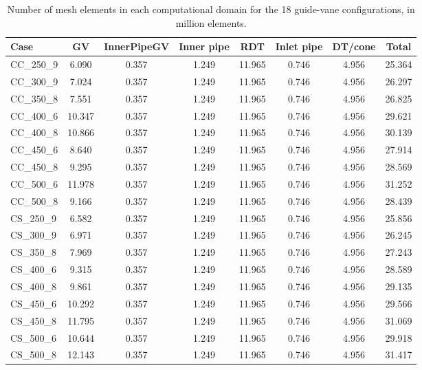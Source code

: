 \begin{table}[H]
\centering
\small
\caption[Mesh element count per domain]{Number of mesh elements in each computational domain for the 18 guide-vane configurations, in million elements.}
\label{tab:mesh-elements-gv-cases}
\begin{tabular}{lccccccc}
\hline
Case
& GV
& InnerPipeGV
& Inner pipe
& RDT
& Inlet pipe
& DT/cone
& Total \\
\hline
CC\_250\_9 & 6.090 & 0.357 & 1.249 & 11.965 & 0.746 & 4.956 & 25.364 \\
CC\_300\_9 & 7.024 & 0.357 & 1.249 & 11.965 & 0.746 & 4.956 & 26.297 \\
CC\_350\_8 & 7.551 & 0.357 & 1.249 & 11.965 & 0.746 & 4.956 & 26.825 \\
CC\_400\_6 & 10.347 & 0.357 & 1.249 & 11.965 & 0.746 & 4.956 & 29.621 \\
CC\_400\_8 & 10.866 & 0.357 & 1.249 & 11.965 & 0.746 & 4.956 & 30.139 \\
CC\_450\_6 & 8.640 & 0.357 & 1.249 & 11.965 & 0.746 & 4.956 & 27.914 \\
CC\_450\_8 & 9.295 & 0.357 & 1.249 & 11.965 & 0.746 & 4.956 & 28.569 \\
CC\_500\_6 & 11.978 & 0.357 & 1.249 & 11.965 & 0.746 & 4.956 & 31.252 \\
CC\_500\_8 & 9.166 & 0.357 & 1.249 & 11.965 & 0.746 & 4.956 & 28.439 \\
\hline
CS\_250\_9 & 6.582 & 0.357 & 1.249 & 11.965 & 0.746 & 4.956 & 25.856 \\
CS\_300\_9 & 6.971 & 0.357 & 1.249 & 11.965 & 0.746 & 4.956 & 26.245 \\
CS\_350\_8 & 7.969 & 0.357 & 1.249 & 11.965 & 0.746 & 4.956 & 27.243 \\
CS\_400\_6 & 9.315 & 0.357 & 1.249 & 11.965 & 0.746 & 4.956 & 28.589 \\
CS\_400\_8 & 9.861 & 0.357 & 1.249 & 11.965 & 0.746 & 4.956 & 29.135 \\
CS\_450\_6 & 10.292 & 0.357 & 1.249 & 11.965 & 0.746 & 4.956 & 29.566 \\
CS\_450\_8 & 11.795 & 0.357 & 1.249 & 11.965 & 0.746 & 4.956 & 31.069 \\
CS\_500\_6 & 10.644 & 0.357 & 1.249 & 11.965 & 0.746 & 4.956 & 29.918 \\
CS\_500\_8 & 12.143 & 0.357 & 1.249 & 11.965 & 0.746 & 4.956 & 31.417 \\
\hline
\end{tabular}
\end{table}

